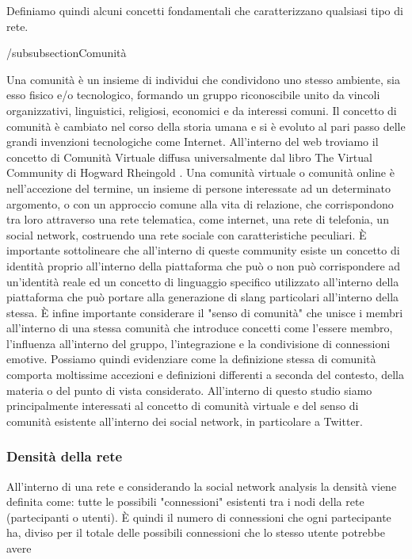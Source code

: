 Definiamo quindi alcuni concetti fondamentali che caratterizzano qualsiasi tipo di rete.

/subsubsection{Comunità}

Una comunità è un insieme di individui che condividono uno stesso ambiente, sia esso fisico e/o tecnologico, formando un gruppo riconoscibile unito da vincoli organizzativi, linguistici, religiosi, economici e da interessi comuni. \cite{Comunita}
Il concetto di comunità è cambiato nel corso della storia umana e si è evoluto al pari passo delle grandi invenzioni tecnologiche come Internet.
All'interno del web troviamo il concetto di Comunità Virtuale \cite{ComunitaVirtuale} diffusa universalmente dal libro The Virtual Community di Hogward Rheingold \cite{VirtualCommunity}. Una comunità virtuale o comunità online è nell'accezione del termine, un insieme di persone interessate ad un determinato argomento, o con un approccio comune alla vita di relazione, che corrispondono tra loro attraverso una rete telematica, come internet, una rete di telefonia, un social network, costruendo una rete sociale con caratteristiche peculiari. È importante sottolineare che all'interno di queste community esiste un concetto di identità proprio all'interno della piattaforma che può o non può corrispondere ad un'identità reale ed un concetto di linguaggio specifico utilizzato all'interno della piattaforma che può portare alla generazione di slang particolari all'interno della stessa.
È infine importante considerare il "senso di comunità" \cite{ComunitaSenso} che unisce i membri all'interno di una stessa comunità che introduce concetti come l'essere membro, l'influenza all'interno del gruppo, l'integrazione e la condivisione di connessioni emotive.
Possiamo quindi evidenziare come la definizione stessa di comunità comporta moltissime accezioni e definizioni differenti a seconda del contesto, della materia o del punto di vista considerato.
All'interno di questo studio siamo principalmente interessati al concetto di comunità virtuale e del senso di comunità esistente all'interno dei social network, in particolare a Twitter.

\subsubsection{Densità della rete}
All'interno di una rete e considerando la social network analysis la densità viene definita come: tutte le possibili "connessioni" esistenti tra i nodi della rete (partecipanti o utenti). È quindi il numero di connessioni che ogni partecipante ha, diviso per il totale delle possibili connessioni che lo stesso utente potrebbe avere \cite{PatternNetworkLearning}

